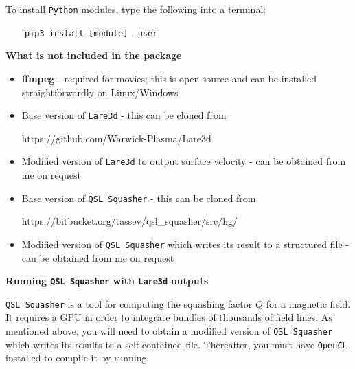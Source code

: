 \documentclass[12pt,twoside]{article}
\begin{document}
\vspace{-2mm}

To install \texttt{Python} modules, type the following into a terminal:

$\quad\quad$\texttt{pip3 install [module] --user}


\vspace{8mm}
{\large \textbf{What is not included in the package}}

\begin{itemize}
\setlength\itemsep{-2mm}

  \item \textbf{ffmpeg} - required for movies; this is open source and can be installed straightforwardly on Linux/Windows
\vspace{2mm}

  \item Base version of \texttt{Lare3d} - this can be cloned from 

\vspace{-3mm}
https://github.com/Warwick-Plasma/Lare3d
\vspace{2mm}

  \item Modified version of \texttt{Lare3d} to output surface velocity - can be obtained from me on request

\vspace{2mm}
  \item Base version of \texttt{QSL Squasher} - this can be cloned from 

\vspace{-3mm}
https://bitbucket.org/tassev/qsl\_squasher/src/hg/
\vspace{2mm}

  \item Modified version of \texttt{QSL Squasher} which writes its result to a structured file - can be obtained from me on request
\vspace{2mm}


\end{itemize}


\vspace{4mm}
{\large \textbf{Running \texttt{QSL Squasher} with \texttt{Lare3d} outputs}}

\texttt{QSL Squasher} is a tool for computing the squashing factor $Q$ for a magnetic field. It requires a GPU in order to integrate bundles of thousands of field lines. As mentioned above, you will need to obtain a modified version of \texttt{QSL Squasher} which writes its results to a self-contained file. Thereafter, you must have \texttt{OpenCL} installed to compile it by running
\end{document}
